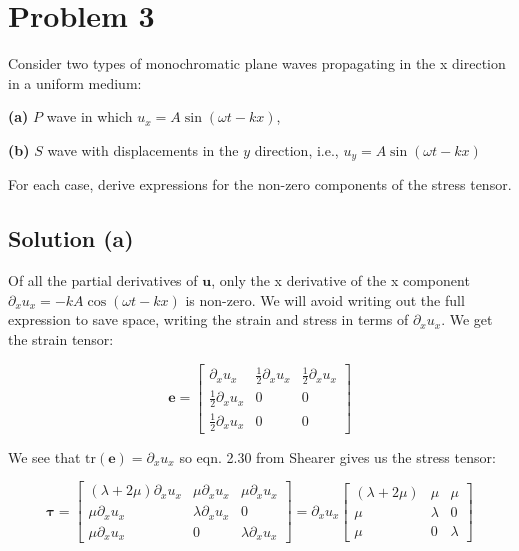 \section*{Problem 3}
Consider two types of monochromatic plane waves propagating in the x direction in a uniform medium: 

\textbf{(a)} $P$ wave in which $u_x = A\sin(\omega t-kx)$,

\textbf{(b)} $S$ wave with displacements in the $y$ direction, i.e., $u_y = A\sin(\omega t-kx)$

For each case, derive expressions for the non-zero components of the stress tensor.

\subsection*{Solution (a)}

Of all the partial derivatives of $\mathbf{u}$, only the x derivative of the x component $\partial_x u_x = -kA\cos(\omega t-kx)$ is non-zero. We will avoid writing out the full expression to save space, writing the strain and stress in terms of $\partial_x u_x$. We get the strain tensor:

\begin{equation*}
    \mathbf{e} = 
    \begin{bmatrix}
        \partial_x u_x & \frac{1}{2}\partial_x u_x & \frac{1}{2}\partial_x u_x \\
        \frac{1}{2}\partial_x u_x & 0 & 0\\
        \frac{1}{2}\partial_x u_x & 0 & 0
    \end{bmatrix}
\end{equation*}

We see that $\text{tr}(\mathbf{e}) = \partial_x u_x$ so eqn. 2.30 from Shearer gives us the stress tensor:

\begin{equation*}
    \boldsymbol{\tau} = 
    \begin{bmatrix}
        (\lambda + 2\mu) \partial_x u_x & \mu \partial_x u_x & \mu \partial_x u_x\\
        \mu \partial_x u_x  & \lambda \partial_x u_x & 0 \\
        \mu \partial_x u_x & 0 & \lambda \partial_x u_x 
    \end{bmatrix}
    = \partial_x u_x 
    \begin{bmatrix}
        (\lambda + 2\mu) & \mu  & \mu \\
        \mu   & \lambda & 0 \\
        \mu  & 0 & \lambda 
    \end{bmatrix}
\end{equation*}

